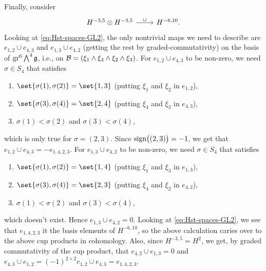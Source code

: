 Finally, consider
\[
  \begin{tikzcd}
    H^{-3,5} \otimes H^{-3,5} \ar[r,"\cup"] & H^{-6,10}.
  \end{tikzcd}
\]
Looking at \eqref{eq:Hst-spaces-GL2}, the only nontrivial maps we need to describe are $e_{1,2} \cup e_{4,3}$ and $e_{1,3} \cup e_{4,2}$ (getting the rest by graded-commutativity) on the basis of $\operatorname{gr}^{6} \bigwedge^{4}\mathfrak{g}$, i.e., on $\mathcal{B} = (\xi_{1} \wedge \xi_{4} \wedge \xi_{2} \wedge \xi_{3})$.  For $e_{1,2} \cup e_{4,3}$ to be non-zero, we need $\sigma \in S_{4}$ that satisfies
\begin{enumerate}[$\bullet$]
  \item $\set{\sigma(1),\sigma(2)} = \set{1,3}$ (putting $\xi_{1}$ and $\xi_{2}$ in $e_{1,2}$),
  \item $\set{\sigma(3),\sigma(4)} = \set{2,4}$ (putting $\xi_{4}$ and $\xi_{3}$ in $e_{4,3}$),
  \item $\sigma(1) < \sigma(2)$ and $\sigma(3) < \sigma(4)$,
\end{enumerate}
which is only true for $\sigma = (2,3)$. Since $\operatorname{sign}\bigl((2,3)\bigr) = -1$, we get that $e_{1,2} \cup e_{4,3} = -e_{1,4,2,3}$. For $e_{1,3} \cup e_{4,2}$ to be non-zero, we need $\sigma \in S_{4}$ that satisfies
\begin{enumerate}[$\bullet$]
  \item $\set{\sigma(1),\sigma(2)} = \set{1,4}$ (putting $\xi_{1}$ and $\xi_{3}$ in $e_{1,3}$),
  \item $\set{\sigma(3),\sigma(4)} = \set{2,3}$ (putting $\xi_{4}$ and $\xi_{2}$ in $e_{4,2}$),
  \item $\sigma(1) < \sigma(2)$ and $\sigma(3) < \sigma(4)$,
\end{enumerate}
which doesn't exist. Hence $e_{1,3} \cup e_{4,2} = 0$. Looking at \eqref{eq:Hst-spaces-GL2}, we see that $e_{1,4,2,3}$ it the basis elements of $H^{-6,10}$, so the above calculation caries over to the above cup products in cohomology. Also, since $H^{-3,5} = H^{2}$, we get, by graded commutativity of the cup product, that $e_{4,2} \cup e_{1,3} = 0$ and $e_{4,3} \cup e_{1,2} = (-1)^{2\times2} e_{1,2} \cup e_{4,3} = e_{1,4,2,3}$.


